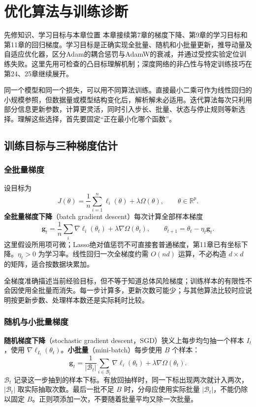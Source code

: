 \documentclass[UTF8,fontset=none,zihao=-4,a4paper]{ctexart}
\newcommand{\chapterpage}[1]{\clearpage\section{#1}}
\newcommand{\term}[1]{\textbf{#1}}
\numberwithin{equation}{section}
\numberwithin{figure}{section}
\begin{document}
\chapterpage{优化算法与训练诊断}\label{ch:training}
\begin{infobox}{先修知识、学习目标与本章位置}
本章接续第7章的梯度下降、第9章的学习目标和第11章的回归梯度。学习目标是正确实现全批量、随机和小批量更新，推导动量及自适应优化器，区分Adam的耦合惩罚与AdamW的衰减，并通过受控实验定位训练失败。这里先用可检查的凸目标理解机制；深度网络的非凸性与特定训练技巧在第24、25章继续展开。
\end{infobox}
同一个模型和同一个损失，可以用不同算法训练。直接最小二乘可作为线性回归的小规模参照，但数据量或模型结构变化后，解析解未必适用。迭代算法每次只利用部分信息更新参数，计算更灵活，同时引入步长、批量、状态与停止规则等新选择。理解这些选择，首先要固定“正在最小化哪个函数”。

\subsection{训练目标与三种梯度估计}
\subsubsection{全批量梯度}
设目标为
\[
 J(\theta)=\frac1n\sum_{i=1}^n\ell_i(\theta)+\lambda\Omega(\theta),
 \qquad \theta\in\mathbb R^p.
\]
\term{全批量梯度下降}（batch gradient descent）每次计算全部样本梯度
\[
 \symbf g_t=\frac1n\sum_i\nabla\ell_i(\theta_t)+\lambda\nabla\Omega(\theta_t),
 \qquad\theta_{t+1}=\theta_t-\eta_t\symbf g_t.
\]
这里假设所用项可微；Lasso绝对值惩罚不可直接套普通梯度，第11章已有坐标下降。$\eta_t>0$ 为学习率。线性回归一次全梯度约需 $O(nd)$ 运算，不必构造 $d\times d$ 的矩阵，适合按数据块累加。

全梯度准确描述当前经验目标，但不等于知道总体风险梯度；训练样本的有限性不会因使用全批量而消失。每一步计算多，更新次数可能少；与其他算法比较时应说明按更新步数、处理样本数还是实际耗时比较。

\subsubsection{随机与小批量梯度}
\term{随机梯度下降}（stochastic gradient descent，SGD）狭义上每步均匀抽一个样本 $I_t$，使用 $\nabla\ell_{I_t}(\theta_t)$。\term{小批量}（mini-batch）每步使用 $B$ 个样本：
\begin{equation}
 \symbf g_t=\frac1{|\mathcal B_t|}\sum_{i\in\mathcal B_t}\nabla\ell_i(\theta_t)
 +\lambda\nabla\Omega(\theta_t).
\end{equation}
$\mathcal B_t$ 记录这一步抽到的样本下标。有放回抽样时，同一下标出现两次就计入两次，$|\mathcal B_t|$ 取实际抽取次数。最后一批不足 $B$ 时，分母应使用实际批量 $|\mathcal B_t|$，不能仍除以固定 $B$。正则项添加一次，不要随着批量平均又除一次批量。
\end{document}
